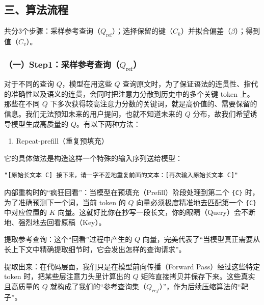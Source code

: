 \hypertarget{ux4e09ux7b97ux6cd5ux6d41ux7a0b}{%
\subsection{三、算法流程}\label{ux4e09ux7b97ux6cd5ux6d41ux7a0b}}

共分3个步骤：采样参考查询（\(Q_{\mathrm{ref}}\)）；选择保留的键（\(C_k\)）并拟合偏差（\(\beta\)）；得到值（\(C_v\)）。

\hypertarget{ux4e00step1ux91c7ux6837ux53c2ux8003ux67e5ux8be2q_mathrmref}{%
\subsubsection{\texorpdfstring{（一）Step1：采样参考查询（\(Q_{\mathrm{ref}}\)）}{（一）Step1：采样参考查询（Q\_\{\textbackslash mathrm\{ref\}\}）}}\label{ux4e00step1ux91c7ux6837ux53c2ux8003ux67e5ux8be2q_mathrmref}}

对于不同的查询 \(Q\)，模型在用这些 \(Q\) 查询原文时，为了保证语法的连贯性、指代的准确性以及语义的连贯，会同时把注意力分散到历史中的多个关键 token 上。那些在不同 \(Q\) 下多次获得较高注意力分数的关键词，就是高价值的、需要保留的信息。我们无法预知未来的用户提问，也就不知道未来的 \(Q\) 分布，故我们希望诱导模型生成高质量的 \(Q\)。有以下两种方法：

\begin{enumerate}
\def\labelenumi{\arabic{enumi}.}
\tightlist
\item
  Repeat-prefill（重复预填充）
\end{enumerate}

它的具体做法是构造这样一个特殊的输入序列送给模型：

\begin{verbatim}
"[原始长文本 C] 接下来，请一字不差地重复前面的文本：[再次输入原始长文本 C]"
\end{verbatim}

内部重构时的``疯狂回看''：当模型在预填充（Prefill）阶段处理到第二个 \texttt{\{C\}} 时，为了准确预测下一个词，当前 token 的 \(Q\) 向量必须极度精准地去匹配第一个 \texttt{\{C\}} 中对应位置的 \(K\) 向量。这就好比你在抄写一段长文，你的眼睛（Query）会不断地、强烈地去回看原稿（Key）。

提取参考查询：这个``回看''过程中产生的 \(Q\) 向量，完美代表了``当模型真正需要从长上下文中精确提取细节时，它会发出怎样的查询请求''。

提取出来：在代码层面，我们只是在模型前向传播（Forward Pass）经过这些特定 token 时，把某些层注意力头里计算出的 \(Q\) 矩阵直接拷贝并保存下来。这些真实且高质量的 \(Q\) 就构成了我们的``参考查询集（\(Q_{ref}\)）''，作为后续压缩算法的``靶子''。


